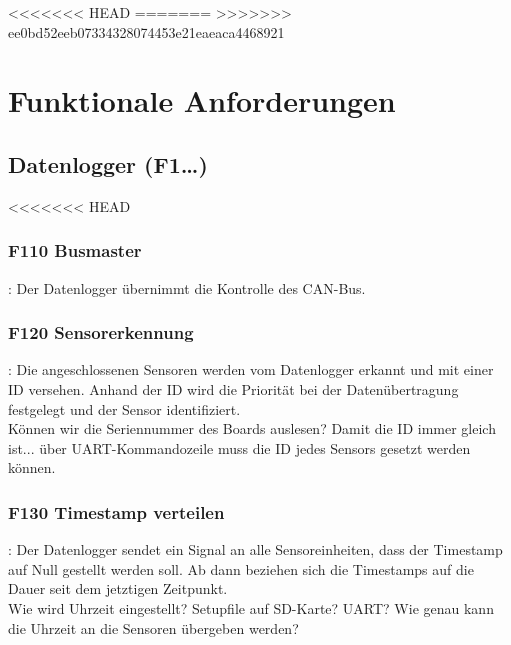 %
<<<<<<< HEAD
=======
>>>>>>> ee0bd52eeb07334328074453e21eaeaca4468921
%

\thispagestyle{empty}
\chapter{Funktionale Anforderungen}\label{chap.funktionale}
\section{Datenlogger (F1\ldots)}
<<<<<<< HEAD
\subsection{F110 Busmaster}: Der Datenlogger übernimmt die Kontrolle des CAN-Bus. 

\subsection{F120 Sensorerkennung}: Die angeschlossenen Sensoren werden vom Datenlogger erkannt und mit einer ID versehen. Anhand der ID wird die Priorität bei der Datenübertragung festgelegt und der Sensor identifiziert.\\
Können wir die Seriennummer des Boards auslesen? Damit die ID immer gleich ist... über UART-Kommandozeile muss die ID jedes Sensors gesetzt werden können.

\subsection{F130 Timestamp verteilen}: Der Datenlogger sendet ein Signal an alle Sensoreinheiten, dass der Timestamp auf Null gestellt werden soll. Ab dann beziehen sich die Timestamps auf die Dauer seit dem jetztigen Zeitpunkt.\\
Wie wird Uhrzeit eingestellt? Setupfile auf SD-Karte? UART? Wie genau kann die Uhrzeit an die Sensoren übergeben werden?

